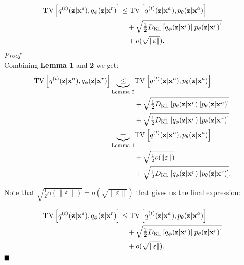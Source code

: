 \begin{equation}
\begin{aligned}
    {\mathrm{TV}\left[q^{(t)}({\mathbf{z}}|{\mathbf{x}}^a) ,q_{\phi}({\mathbf{z}}|{\mathbf{x}}^r) \right]}
&\leq 
{\mathrm{TV}\left[q^{(t)}({\mathbf{z}}|{\mathbf{x}}^a) ,p_{\theta}({\mathbf{z}}|{\mathbf{x}}^a) \right]}
      \\ 
 &\quad+   \sqrt{\tfrac12  D_{\mathrm{KL}}\left[q_{\phi}({\mathbf{z}}|{\mathbf{x}}^r)\|p_{\theta}({\mathbf{z}}|{\mathbf{x}}^r)\right]} \\
  &\quad+ o(\sqrt{\|\varepsilon\|}).
    \end{aligned}
\end{equation}
\textit{Proof}\\
Combining \textbf{Lemma 1} and \textbf{2} we get:
\begin{align}
    {\mathrm{TV}\left[q^{(t)}({\mathbf{z}}|{\mathbf{x}}^a) ,q_{\phi}({\mathbf{z}}|{\mathbf{x}}^r) \right]}
\underbrace{\leq }_{\text{Lemma 2}}
    &{\mathrm{TV}\left[q^{(t)}({\mathbf{z}}|{\mathbf{x}}^a) ,p_{\theta}({\mathbf{z}}|{\mathbf{x}}^a) \right]} \\
     &+ 
    \sqrt{\tfrac12 D_{\mathrm{KL}}\left[p_{\theta}({\mathbf{z}}|{\mathbf{x}}^r)\|p_{\theta}({\mathbf{z}}|{\mathbf{x}}^a)\right]} \\
    &+
   \sqrt{\tfrac12  D_{\mathrm{KL}}\left[q_{\phi}({\mathbf{z}}|{\mathbf{x}}^r)\|p_{\theta}({\mathbf{z}}|{\mathbf{x}}^r)\right]} \\
   \underbrace{=}_{\substack{\text{Lemma 1}}}
 &{\mathrm{TV}\left[q^{(t)}({\mathbf{z}}|{\mathbf{x}}^a) ,p_{\theta}({\mathbf{z}}|{\mathbf{x}}^a) \right]}\\
     &+ 
    \sqrt{\tfrac12 o(\|\varepsilon\|)  }\\
    &+
   \sqrt{\tfrac12  D_{\mathrm{KL}}\left[q_{\phi}({\mathbf{z}}|{\mathbf{x}}^r)\|p_{\theta}({\mathbf{z}}|{\mathbf{x}}^r)\right]}.
\end{align}

Note that $\sqrt{\tfrac12 o(\|\varepsilon\|)  } =  o(\sqrt{\|\varepsilon\|}) $ that gives us the final expression:

\begin{equation}
\begin{aligned}
    {\mathrm{TV}\left[q^{(t)}({\mathbf{z}}|{\mathbf{x}}^a) ,q_{\phi}({\mathbf{z}}|{\mathbf{x}}^r) \right]}
&\leq 
 {\mathrm{TV}\left[q^{(t)}({\mathbf{z}}|{\mathbf{x}}^a) ,p_{\theta}({\mathbf{z}}|{\mathbf{x}}^a) \right]}
     \\
  &\quad+ \sqrt{\tfrac12  D_{\mathrm{KL}}\left[q_{\phi}({\mathbf{z}}|{\mathbf{x}}^r)\|p_{\theta}({\mathbf{z}}|{\mathbf{x}}^r)\right]} \\
    &\quad+ o(\sqrt{\|\varepsilon\|}).
    \end{aligned}
\end{equation}
$\hfill\blacksquare$


